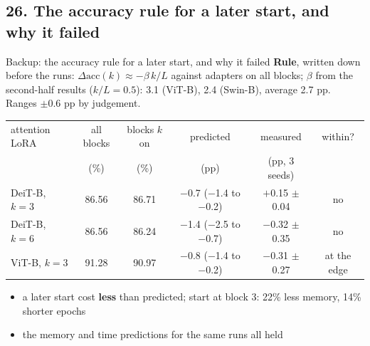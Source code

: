 \documentclass[aspectratio=169,11pt]{beamer}
\begin{document}
\subsection{26. The accuracy rule for a later start, and why it failed}
\begin{frame}{Backup: the accuracy rule for a later start, and why it failed}
\small
\textbf{Rule}, written down before the runs: $\Delta\text{acc}(k) \approx -\beta\,k/L$ against adapters on all blocks; $\beta$ from the second-half results ($k/L=0.5$): 3.1 (ViT-B), 2.4 (Swin-B), average 2.7 pp. Ranges $\pm$0.6 pp by judgement.
\par\medskip\centering\footnotesize
\begin{tabular}{lccccc}
\toprule
attention LoRA & all blocks & blocks $k$ on & predicted & measured & within? \\
 & (\%) & (\%) & (pp) & (pp, 3 seeds) & \\
\midrule
DeiT-B, $k=3$ & 86.56 & 86.71 & $-$0.7 ($-$1.4 to $-$0.2) & $+$0.15 $\pm$ 0.04 & \alert{no} \\
DeiT-B, $k=6$ & 86.56 & 86.24 & $-$1.4 ($-$2.5 to $-$0.7) & $-$0.32 $\pm$ 0.35 & \alert{no} \\
ViT-B, $k=3$  & 91.28 & 90.97 & $-$0.8 ($-$1.4 to $-$0.2) & $-$0.31 $\pm$ 0.27 & at the edge \\
\bottomrule
\end{tabular}
\par\medskip\raggedright\small
\begin{itemize}
  \item a later start cost \textbf{less} than predicted; start at block 3: 22\% less memory, 14\% shorter epochs
  \item the memory and time predictions for the same runs all held
\end{itemize}
\end{frame}
\end{document}

